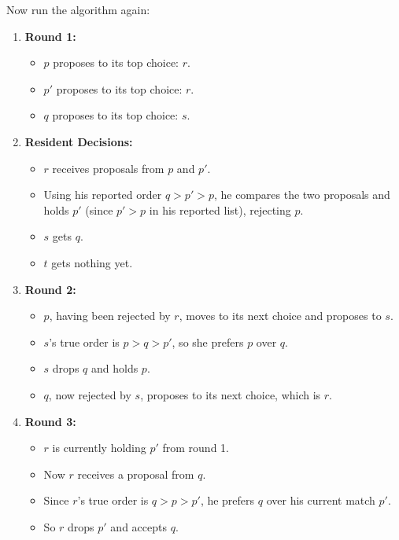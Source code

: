 \documentclass[12pt]{article}
\begin{document}
Now run the algorithm again:

\begin{enumerate}
    \item \textbf{Round 1:}
    \begin{itemize}
        \item $p$ proposes to its top choice: $r$.
        \item $p'$ proposes to its top choice: $r$.
        \item $q$ proposes to its top choice: $s$.
    \end{itemize}

    \item \textbf{Resident Decisions:}
    \begin{itemize}
        \item $r$ receives proposals from $p$ and $p'$.  
        \item Using his reported order $q > p' > p$, he compares the two proposals and holds $p'$ (since $p' > p$ in his reported list), rejecting $p$.
        \item $s$ gets $q$.
        \item $t$ gets nothing yet.
    \end{itemize}

    \item \textbf{Round 2:}
    \begin{itemize}
        \item $p$, having been rejected by $r$, moves to its next choice and proposes to $s$.
        \item $s$'s true order is $p > q > p'$, so she prefers $p$ over $q$.
        \item $s$ drops $q$ and holds $p$.
        \item $q$, now rejected by $s$, proposes to its next choice, which is $r$.
    \end{itemize}

    \item \textbf{Round 3:}
    \begin{itemize}
        \item $r$ is currently holding $p'$ from round 1.
        \item Now $r$ receives a proposal from $q$.
        \item Since $r$'s true order is $q > p > p'$, he prefers $q$ over his current match $p'$.
        \item So $r$ drops $p'$ and accepts $q$.
    \end{itemize}


\end{enumerate}
\end{document}
